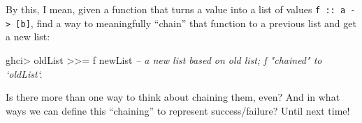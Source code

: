 \documentclass[]{article}
\newenvironment{Shaded}{}{}
\newcommand{\CommentTok}[1]{\textcolor[rgb]{0.38,0.63,0.69}{\textit{#1}}}
\newcommand{\FunctionTok}[1]{\textcolor[rgb]{0.02,0.16,0.49}{#1}}
\newcommand{\NormalTok}[1]{#1}
\begin{document}
By this, I mean, given a function that turns a value into a list of values
\texttt{f\ ::\ a\ -\textgreater{}\ {[}b{]}}, find a way to meaningfully
``chain'' that function to a previous list and get a new list:

\begin{Shaded}
\begin{Highlighting}[]
\NormalTok{ghci}\FunctionTok{>}\NormalTok{ oldList }\FunctionTok{>>=}\NormalTok{ f}
\NormalTok{newList             }\CommentTok{-- a new list based on old list; f "chained" to `oldList`.}
\end{Highlighting}
\end{Shaded}

Is there more than one way to think about chaining them, even? And in what ways
we can define this ``chaining'' to represent success/failure? Until next time!
\end{document}
